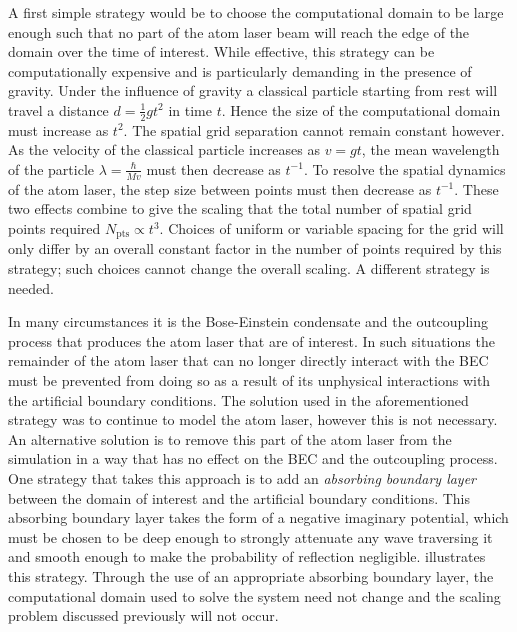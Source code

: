 A first simple strategy would be to choose the computational domain to be large enough such that no part of the atom laser beam will reach the edge of the domain over the time of interest. While effective, this strategy can be computationally expensive and is particularly demanding in the presence of gravity. Under the influence of gravity a classical particle starting from rest will travel a distance $d = \frac{1}{2}g t^2$ in time $t$. Hence the size of the computational domain must increase as $t^2$. The spatial grid separation cannot remain constant however. As the velocity of the classical particle increases as $v = gt$, the mean wavelength of the particle $\displaystyle \lambda = \frac{\hbar}{Mv}$ must then decrease as $t^{-1}$.  To resolve the spatial dynamics of the atom laser, the step size between points must then decrease as $t^{-1}$. These two effects combine to give the scaling that the total number of spatial grid points required $N_\text{pts} \propto t^3$. Choices of uniform or variable spacing for the grid will only differ by an overall constant factor in the number of points required by this strategy; such choices cannot change the overall scaling. A different strategy is needed.

In many circumstances it is the Bose-Einstein condensate and the outcoupling process that produces the atom laser that are of interest. In such situations the remainder of the atom laser that can no longer directly interact with the BEC must be prevented from doing so as a result of its unphysical interactions with the artificial boundary conditions. The solution used in the aforementioned strategy was to continue to model the atom laser, however this is not necessary. An alternative solution is to remove this part of the atom laser from the simulation in a way that has no effect on the BEC and the outcoupling process. One strategy that takes this approach is to add an \emph{absorbing boundary layer}~\citep{Kosloff:1986,Neuhasuer:1989} between the domain of interest and the artificial boundary conditions. This absorbing boundary layer takes the form of a negative imaginary potential, which must be chosen to be deep enough to strongly attenuate any wave traversing it and smooth enough to make the probability of reflection negligible.  illustrates this strategy. Through the use of an appropriate absorbing boundary layer, the computational domain used to solve the system need not change and the scaling problem discussed previously will not occur.

